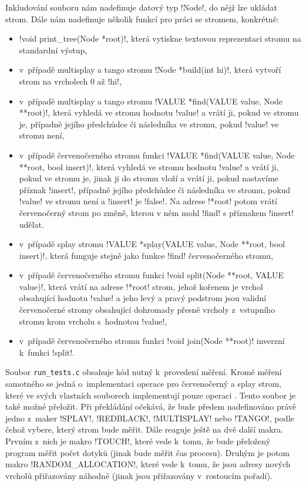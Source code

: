 Inkludování souboru nám nadefinuje datový typ !Node!, do nějž lze ukládat strom. Dále nám nadefinuje několik funkcí pro práci se stromem, konkrétně:

\begin{itemize}
\item !void print_tree(Node *root)!, která vytiskne textovou reprezentaci stro\-mu na standardní výstup,
\item v~případě multisplay a tango stromu !Node *build(int hi)!, která vytvoří strom na vrcholech 0 až !hi!,
\item v~případě multisplay a tango stromu !VALUE *find(VALUE value, Node **root)!, která vyhledá ve stromu hodnotu !value! a vrátí ji, pokud ve stromu je, případně jejího předchůdce či následníka ve stromu, pokud !value! ve stromu není,
\item v~případě červenočerného stromu funkci !VALUE *find(VALUE value, Node **root, bool insert)!, která vyhledá ve stromu hodnotu !value! a vrátí ji, pokud ve stromu je, jinak ji do stromu vloží a vrátí ji, pokud nastavíme příznak !insert!, případně jejího předchůdce či následníka ve stromu, pokud !value! ve stromu není a !insert! je !false!. Na adrese !*root! potom vrátí červenočerný strom po změně, kterou v něm mohl !find! s příznakem !insert! udělat.
\item v~případě splay stromu !VALUE *splay(VALUE value, Node **root, bool insert)!, která funguje stejně jako funkce !find! červenočerného stromu,
\item v~případě červenočerného stromu funkci !void split(Node **root, VALUE value)!, která vrátí na adrese !*root! strom, jehož kořenem je vrchol obsahující hodnotu !value! a jeho levý a pravý podstrom jsou validní červenočerné stromy obsahující dohromady přesně vrcholy z~vstupního stromu krom vrcholu s~hodnotou !value!,
\item v~případě červenočerného stromu funkci !void join(Node **root)! inverzní k~funkci !split!.
\end{itemize}

Soubor {\tt run_tests.c} obsahuje kód nutný k~provedení měření. Kromě měření
samotného se jedná o~implementaci operace  pro červenočerný a splay
strom, které ve svých vlastních souborech implementují pouze operaci
. Tento soubor je také možné přeložit. Při překládání očekává, že
bude předem nadefinováno právě jedno z~maker !SPLAY!, !REDBLACK!, !MULTISPLAY!
nebo !TANGO!, podle čehož vybere, který strom bude měřit. Dále reaguje ještě na
dvě další makra. Prvním z~nich je makro !TOUCH!, které vede k~tomu, že bude
přeložený program měřit počet dotyků (jinak bude měřit čas procesu). Druhým je
potom makro !RANDOM_ALLOCATION!, které vede k~tomu, že jsou adresy nových
vrcholů přiřazovány náhodně (jinak jsou přiřazovány v~rostoucím pořadí).

